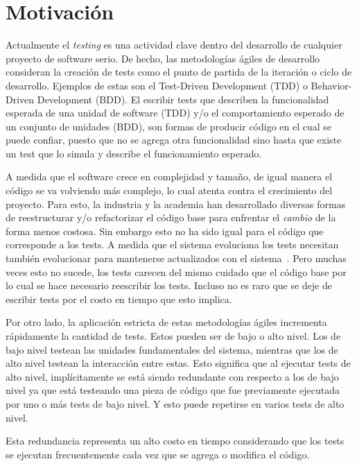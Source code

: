 \section{Motivación}
\par Actualmente el \emph{testing} es una actividad clave dentro del desarrollo de cualquier proyecto de software serio. De hecho, las metodologías ágiles de desarrollo consideran la creación de tests como el punto de partida de la iteración o ciclo de desarrollo. Ejemplos de estas son el Test-Driven Development (TDD) o Behavior-Driven Development (BDD). El escribir tests que describen la funcionalidad esperada de una unidad de software (TDD) y/o el comportamiento esperado de un conjunto de unidades (BDD), son formas de producir código en el cual se puede confiar, puesto que no se agrega otra funcionalidad sino hasta que existe un test que lo simula y describe el funcionamiento esperado.

\par A medida que el software crece en complejidad y tamaño, de igual manera el código se va volviendo más complejo, lo cual atenta contra el crecimiento del proyecto. Para esto, la industria y la academia han desarrollado diversas formas de reestructurar y/o refactorizar el código base para enfrentar el \emph{cambio} de la forma menos costosa. Sin embargo esto no ha sido igual para el código que corresponde a los tests. A medida que el sistema evoluciona los tests necesitan también evolucionar para mantenerse actualizados con el sistema~\cite{reichhart2007rule}.  Pero muchas veces esto no sucede, los tests carecen del mismo cuidado que el código base por lo cual se hace necesario reescribir los tests. Incluso no es raro que se deje de escribir tests por el costo en tiempo que esto implica.

\par Por otro lado, la aplicación estricta de estas metodologías ágiles incrementa rápidamente la cantidad de tests. Estos pueden ser de bajo o alto nivel. Los de bajo nivel testean las unidades fundamentales del sistema,  mientras que los de alto nivel testean la interacción entre estas. Esto significa que al ejecutar tests de alto nivel, implícitamente se está siendo redundante con respecto a los de bajo nivel ya que está testeando una pieza de código que fue previamente ejecutada por uno o más tests de bajo nivel. Y esto puede repetirse en varios tests de alto nivel.

\par Esta redundancia representa un alto costo en tiempo considerando que los tests se ejecutan frecuentemente cada vez que se agrega o modifica el código. 

